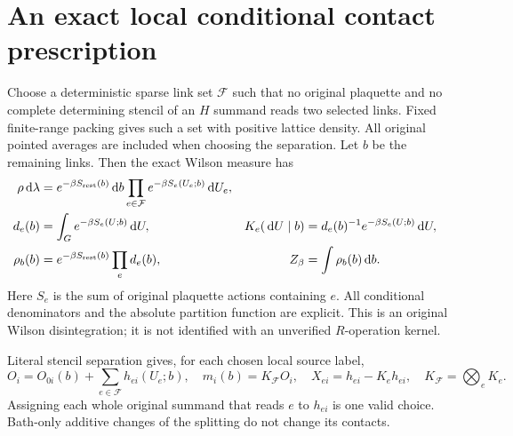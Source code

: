 \documentclass[11pt,letterpaper]{article}
\theoremstyle{plain}
\theoremstyle{remark}\newtheorem{remark}[theorem]{Scope}
\newcommand{\dd}{\,\mathrm d}\newcommand{\OH}{\mathcal O_H}
\begin{document}
\section{An exact local conditional contact prescription}
\label{sec:conditional}

Choose a deterministic sparse link set $\mathcal F$ such that no original
plaquette and no complete determining stencil of an $H$ summand reads two
selected links. Fixed finite-range packing gives such a set with positive lattice
density. All original pointed averages are included when choosing the separation.
Let $b$ be the remaining links. Then the exact Wilson measure has
\begin{align}
\rho\dd\lambda
&=e^{-\beta S_{\mathrm{rest}}(b)}\dd b
\prod_{e\in\mathcal F}e^{-\beta S_e(U_e;b)}\dd U_e,\notag\\
d_e(b)&=\int_Ge^{-\beta S_e(U;b)}\dd U,
&K_e(\dd U\mid b)&=d_e(b)^{-1}e^{-\beta S_e(U;b)}\dd U,\notag\\
\rho_b(b)&=e^{-\beta S_{\mathrm{rest}}(b)}\prod_e d_e(b),
&Z_\beta&=\int\rho_b(b)\dd b.
\label{eq:disintegration}
\end{align}
Here $S_e$ is the sum of original plaquette actions containing $e$. All conditional
denominators and the absolute partition function are explicit. This is an original
Wilson disintegration; it is not identified with an unverified $R$-operation kernel.

Literal stencil separation gives, for each chosen local source label,
\begin{equation}
O_i=O_{0i}(b)+\sum_{e\in\mathcal F}h_{ei}(U_e;b),\quad
m_i(b)=K_{\mathcal F}O_i,\quad
X_{ei}=h_{ei}-K_eh_{ei},\quad K_{\mathcal F}=\bigotimes_eK_e.
\label{eq:localdecomp}
\end{equation}
Assigning each whole original summand that reads $e$ to $h_{ei}$ is one valid
choice. Bath-only additive changes of the splitting do not change its contacts.
\end{document}
